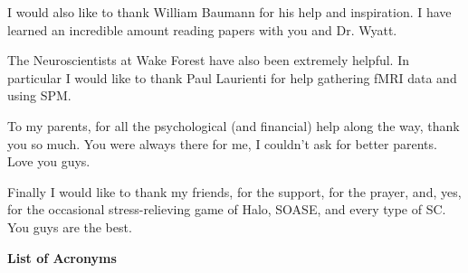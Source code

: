\documentclass[12pt]{report}
\numberwithin{algorithm}{chapter}
\begin{document}
I would also like to thank William Baumann for his help and inspiration. I
have learned an incredible amount reading papers with you and Dr. Wyatt.

The Neuroscientists at Wake Forest have also been extremely helpful. In 
particular I would like to thank Paul Laurienti for help gathering fMRI
data and using SPM.

To my parents, for all the psychological (and financial) help along the way,
thank you so much. You were always there for me, I couldn't
ask for better parents. Love you guys.

Finally I would like to thank my friends, for the support, for the prayer,
and, yes, for the occasional stress-relieving game of Halo, SOASE, and every
type of SC.  You guys are the best. 

\tableofcontents
\pagebreak

\listoffigures
\pagebreak

\listoftables
\pagebreak

\huge
\bfseries
List of Acronyms
\mdseries
\normalsize
\begin{acronym}[CMRO2]
\end{acronym}
\pagebreak

\pagestyle{myheadings}











%
%
%
%

\end{document}
